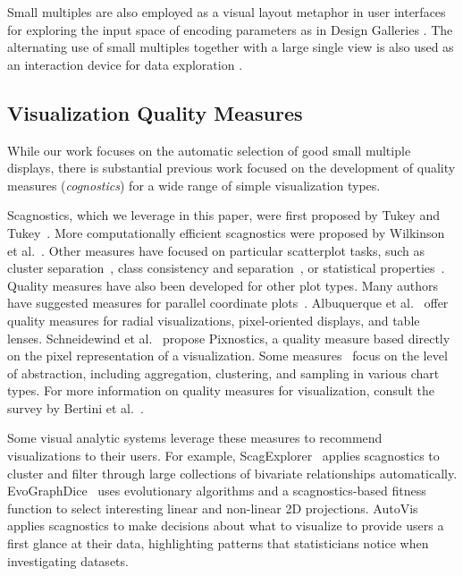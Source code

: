 
Small multiples are also employed as a visual layout metaphor in user interfaces for exploring the input space of encoding parameters as in Design Galleries \cite{marks1997}. The alternating use of small multiples together with a large single view is also used as an interaction device for data exploration \cite{van2013}.

\subsection{Visualization Quality Measures}
While our work focuses on the automatic selection of good small multiple displays, there is substantial previous work focused on the development of quality measures (\emph{cognostics}) for a wide range of simple visualization types. 

Scagnostics, which we leverage in this paper, were first proposed by Tukey and Tukey~\cite{Tukey1982, Tukey1985}. More computationally efficient scagnostics were proposed by Wilkinson et al.~\cite{Wilkinson2005, Wilkinson2008}. Other measures have focused on particular scatterplot tasks, such as cluster separation~\cite{Sedlmair2012, Tatu2009}, class consistency and separation~\cite{Sips2009, Schafer2013}, or statistical properties~\cite{Kandel2012, Seo2005, Piringer2008}.
Quality measures have also been developed for other plot types. Many authors have suggested measures for parallel coordinate plots~\cite{Ankerst1998, Dasgupta2010, Johansson2009, Yang2003}. Albuquerque et al.~\cite{Albuquerque2010} offer quality measures for radial visualizations, pixel-oriented displays, and table lenses. Schneidewind et al.~\cite{Schneidewind2006} propose Pixnostics, a quality measure based directly on the pixel representation of a visualization. Some measures~\cite{Bertini2006, Cui2006, Yang2003} focus on the level of abstraction, including aggregation, clustering, and sampling in various chart types. For more information on quality measures for visualization, consult the survey by Bertini et al.~\cite{Bertini2011}. 

Some visual analytic systems leverage these measures to recommend visualizations to their users. For example, ScagExplorer~\cite{Dang2014} applies scagnostics to cluster and filter through large collections of bivariate relationships automatically.
EvoGraphDice~\cite{Boukhelifa2013} uses evolutionary algorithms and a scagnostics-based fitness function to select interesting linear and non-linear 2D projections.
AutoVis~\cite{Wills2010} applies scagnostics to make decisions about what to visualize to provide users a first glance at their data, highlighting patterns that statisticians notice when investigating datasets.

